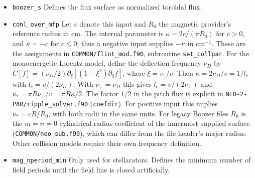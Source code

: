 \documentclass{article}
\begin{document}
\begin{itemize}
 \item \verb|boozer_s| \newline
 Defines the flux surface as normalized toroidal flux.
 \item \verb|conl_over_mfp|\newline
 Let $c$ denote this input and $R_0$ the magnetic provider's reference
 radius in cm. The internal parameter is
 $\kappa=2c/(\pi R_0)$ for $c>0$, and $\kappa=-c$ for $c\leq0$;
 thus a negative input supplies $-\kappa$ in $\mathrm{cm}^{-1}$.
 These are the assignments in \texttt{COMMON/flint\_mod.f90},
 subroutine \texttt{set\_collpar}.
 For the monoenergetic Lorentz model, define the deflection frequency
 $\nu_D$ by $C[f]=(\nu_D/2)\partial_\xi[(1-\xi^2)\partial_\xi f]$,
 where $\xi=v_\parallel/v$. Then $\kappa=2\nu_D/v=1/l_c$ with
 $l_c=v/(2\nu_D)$. With $\nu_\perp=\nu_D$ this
 gives $l_c=v/(2\nu_\perp)$ and $\nu_*=\pi R\nu_\perp/v=\pi R\kappa/2$.
 The factor $1/2$ in the pitch flux is explicit in
 \texttt{NEO-2-PAR/ripple\_solver.f90} (\texttt{coefdir}).
 For positive input this implies $\nu_*=cR/R_0$, with both radii
 in the same units. For legacy Boozer files $R_0$ is the $m=n=0$
 cylindrical-radius coefficient of the innermost supplied surface
 (\texttt{COMMON/neo\_sub.f90}), which can differ from the file header's
 major radius. Other collision models require their own frequency definition.
 \item \verb|mag_nperiod_min|\newline
 Only used for stellarators. Defines the minimum number of field periods
 until the field line is closed artificially.
\end{itemize}
\end{document}
